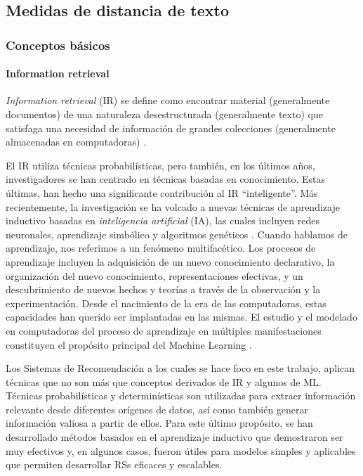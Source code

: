 \subsection{Medidas de distancia de texto}
\subsubsection{Conceptos básicos}
\paragraph{Information retrieval}
\textit{Information retrieval} (IR) se define como encontrar material (generalmente documentos) de una naturaleza desestructurada (generalmente texto) que satisfaga una necesidad de información de grandes colecciones (generalmente almacenadas en computadoras) \citep{schutze2008introduction}.

\bigskip El IR utiliza técnicas probabilísticas, pero también, en los últimos años, investigadores se han centrado en técnicas basadas en conocimiento. Estas últimas, han hecho una significante contribución al IR “inteligente”. Más recientemente, la investigación se ha volcado a nuevas técnicas de aprendizaje inductivo basadas en \textit{inteligencia artificial} (IA), las cuales incluyen redes neuronales, aprendizaje simbólico y algoritmos genéticos \citep{chen1995machine}. Cuando hablamos de aprendizaje, nos referimos a un fenómeno multifacético. Los procesos de aprendizaje incluyen la adquisición de un nuevo conocimiento declarativo, la organización del nuevo conocimiento, representaciones efectivas, y un descubrimiento de nuevos hechos y teorías a través de la observación y la experimentación. Desde el nacimiento de la era de las computadoras, estas capacidades han querido ser implantadas en las mismas. El estudio y el modelado en computadoras del proceso de aprendizaje en múltiples manifestaciones constituyen el propósito principal del Machine Learning \citep{mitchell2013artificial}.

\bigskip Los Sistemas de Recomendación a los cuales se hace foco en este trabajo, aplican técnicas que no son más que conceptos derivados de IR y algunos de ML. Técnicas probabilísticas y determinísticas son utilizadas para extraer información relevante desde diferentes orígenes de datos, así como también generar información valiosa a partir de ellos. Para este último propósito, se han desarrollado métodos basados en el aprendizaje inductivo que demostraron ser muy efectivos y, en algunos casos, fueron útiles para modelos simples y aplicables que permiten desarrollar RSs eficaces y escalables.

